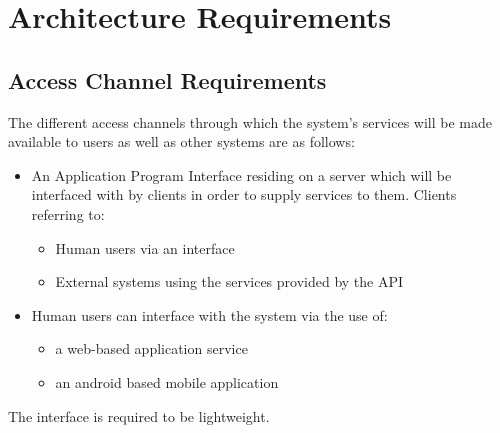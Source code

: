 \documentclass{article}
\begin{document}
	\cleardoublepage
	\section{Architecture Requirements}\label{sec:architecture}
		\subsection{Access Channel Requirements}\label{subsec:access}
			The different access channels through which the system's services will be made available to users as well as other systems are as follows:
			\begin{itemize}
			  \item An Application Program Interface residing on a server which will be interfaced with by clients in order to supply services to them. Clients referring to:
			  \begin{itemize}
			  	\item Human users via an interface
			  	\item External systems using the services provided by the API
			  \end{itemize}
			  \item Human users can interface with the system via the use of:
			  \begin{itemize}
			  	\item a web-based application service
			  	\item an android based mobile application
			  \end{itemize}
			\end{itemize}
			The interface is required to be lightweight.
		
\end{document}
